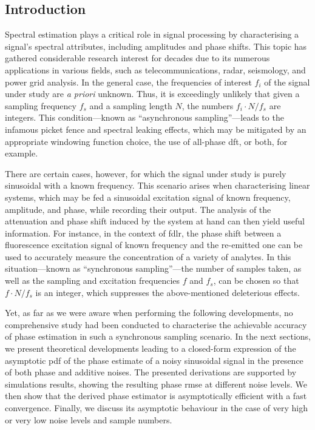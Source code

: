 \subsection{Introduction}

Spectral estimation plays a critical role in signal processing by characterising a signal's spectral attributes, including amplitudes and phase shifts. This topic has gathered considerable research interest for decades due to its numerous applications in various fields, such as telecommunications, radar, seismology, and power grid analysis\cite{marple1989, scharf1991_statistical, stoica2005spectral, marple2019_digital}. In the general case, the frequencies of interest $f_i$ of the signal under study are \textit{a priori} unknown. Thus, it is exceedingly unlikely that given a sampling frequency $f_s$ and a sampling length $N$, the numbers $f_i\cdot N / f_s$ are integers. This condition---known as \enquote{asynchronous sampling}---leads to the infamous picket fence and spectral leaking effects\cite{girgis1980}, which may be mitigated by an appropriate windowing function choice\cite{schuster2009}, the use of all-phase \gls{dft}\cite{xiaohong2007, xiaohong2008}, or both\cite{su2018}, for example.

There are certain cases, however, for which the signal under study is purely sinusoidal with a known frequency. This scenario arises when characterising linear systems, which may be fed a sinusoidal excitation signal of known frequency, amplitude, and phase, while recording their output. The analysis of the attenuation and phase shift induced by the system at hand can then yield useful information. For instance, in the context of \gls{fdlr}\cite{klimant2001_pap}, the phase shift between a fluorescence excitation signal of known frequency and the re-emitted one can be used to accurately measure the concentration of a variety of analytes\cite{bultzingslowen2002, atamanchuk2014, staudinger2018, tufan2022}. In this situation---known as \enquote{synchronous sampling}---the number of samples taken, as well as the sampling and excitation frequencies $f$ and $f_s$, can be chosen so that $f\cdot N / f_s$ is an integer, which suppresses the above-mentioned deleterious effects\cite{girgis1980, ferrero1992}.

Yet, as far as we were aware when performing the following developments, no comprehensive study had been conducted to characterise the achievable accuracy of phase estimation in such a synchronous sampling scenario. In the next sections, we present theoretical developments leading to a closed-form expression of the asymptotic \gls{pdf} of the phase estimate of a noisy sinusoidal signal in the presence of both phase and additive noises. The presented derivations are supported by simulations results, showing the resulting phase \gls{rmse} at different noise levels. We then show that the derived phase estimator is asymptotically efficient with a fast convergence. Finally, we discuss its asymptotic behaviour in the case of very high or very low noise levels and sample numbers.

